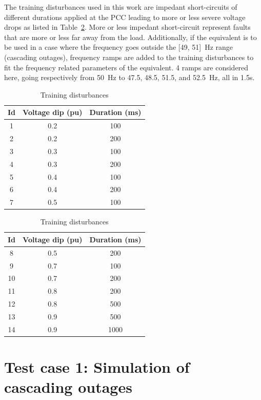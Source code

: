 The training disturbances used in this work are impedant short-circuits of different durations applied at the PCC leading to more or less severe voltage drops as listed in Table~\ref{tab:disturbances}. More or less impedant short-circuit represent faults that are more or less far away from the load. Additionally, if the equivalent is to be used in a case where the frequency goes outside the [49, 51]~Hz range (cascading outages), frequency ramps are added to the training disturbances to fit the frequency related parameters of the equivalent. 4 ramps are considered here, going respectively from 50~Hz to 47.5, 48.5, 51.5, and 52.5~Hz, all in 1.5s.

\begin{table}
\centering
\caption{Training disturbances}
\label{tab:disturbances}
\begin{tabular}{@{}ccc@{}}
\toprule
Id & Voltage dip (pu) & Duration (ms) \\ \midrule
1  & 0.2               & 100           \\
2  & 0.2               & 200           \\
3  & 0.3               & 100           \\
4  & 0.3               & 200           \\
5  & 0.4               & 100           \\
6  & 0.4               & 200           \\
7  & 0.5               & 100           \\ \bottomrule
\end{tabular}
\hspace{1cm}
\begin{tabular}{@{}ccc@{}}
\toprule
Id & Voltage dip (pu) & Duration (ms) \\ \midrule
8  & 0.5               & 200           \\
9  & 0.7               & 100           \\
10 & 0.7               & 200           \\
11 & 0.8               & 200           \\
12 & 0.8               & 500           \\
13 & 0.9               & 500           \\
14 & 0.9               & 1000          \\ \bottomrule
\end{tabular}
\end{table}


\section{Test case 1: Simulation of cascading outages}
\label{sec:distrib_ISGT}

